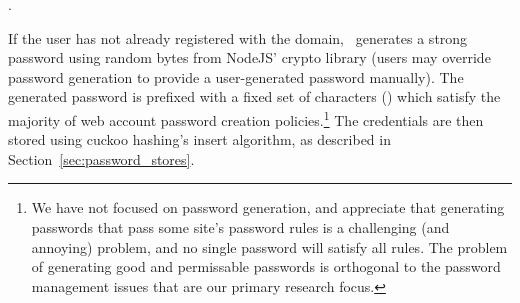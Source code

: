   . 
  
  
   If the user has not already registered with the domain, \SecPass\ generates a strong password using random bytes from NodeJS' crypto library (users may override password generation to provide a user-generated password manually). 
  The generated password is prefixed with a fixed set of characters () which satisfy the majority of web account password creation policies.\footnote{We have not focused on password generation, and appreciate that generating passwords that pass some site's password rules is a challenging (and annoying) problem, and no single password will satisfy all rules. The problem of generating good and permissable passwords is orthogonal to the password management issues that are our primary research focus.} The credentials are then stored using cuckoo hashing's insert algorithm, as described in Section~\ref{sec:password_stores}.





     



